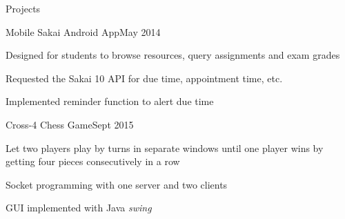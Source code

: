 \documentclass{resume} %
\begin{document}
\begin{rSection}{Projects}

	\begin{rSubsection}{Mobile Sakai Android App}{May 2014}{}{}
	\item Designed for students to browse resources, query assignments and exam grades
	\item Requested the Sakai 10 API for due time, appointment time, etc.
	\item Implemented reminder function to alert due time
	\end{rSubsection}
	
	
	\begin{rSubsection}{Cross-4 Chess Game}{Sept 2015}{}{}
		\item Let two players play by turns in separate windows until one player wins by getting four pieces consecutively in a row 
		\item Socket programming with one server and two clients
		\item GUI implemented with Java \textit{swing}		
	\end{rSubsection}

\end{rSection}
\end{document}
